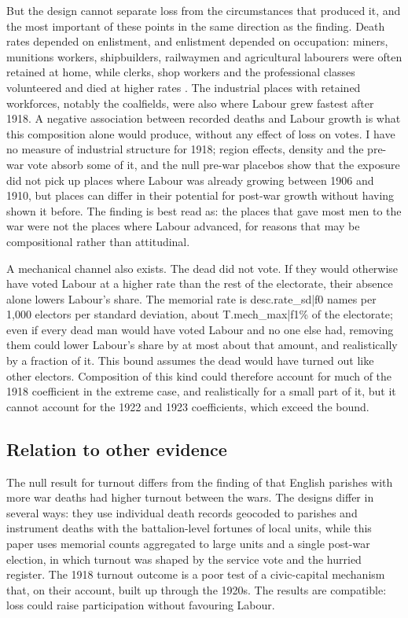 \documentclass[11pt,a4paper]{article}
\begin{document}
But the design cannot separate loss from the circumstances that produced it, and the most important of these points in the same direction as the finding. Death rates depended on enlistment, and enlistment depended on occupation: miners, munitions workers, shipbuilders, railwaymen and agricultural labourers were often retained at home, while clerks, shop workers and the professional classes volunteered and died at higher rates \citep{winter1977,dewey1984}. The industrial places with retained workforces, notably the coalfields, were also where Labour grew fastest after 1918. A negative association between recorded deaths and Labour growth is what this composition alone would produce, without any effect of loss on votes. I have no measure of industrial structure for 1918; region effects, density and the pre-war vote absorb some of it, and the null pre-war placebos show that the exposure did not pick up places where Labour was already growing between 1906 and 1910, but places can differ in their potential for post-war growth without having shown it before. The finding is best read as: the places that gave most men to the war were not the places where Labour advanced, for reasons that may be compositional rather than attitudinal.

A mechanical channel also exists. The dead did not vote. If they would otherwise have voted Labour at a higher rate than the rest of the electorate, their absence alone lowers Labour's share. The memorial rate is {{desc.rate_sd|f0}} names per 1,000 electors per standard deviation, about {{T.mech_max|f1}}\% of the electorate; even if every dead man would have voted Labour and no one else had, removing them could lower Labour's share by at most about that amount, and realistically by a fraction of it. This bound assumes the dead would have turned out like other electors. Composition of this kind could therefore account for much of the 1918 coefficient in the extreme case, and realistically for a small part of it, but it cannot account for the 1922 and 1923 coefficients, which exceed the bound.

\subsection{Relation to other evidence}
The null result for turnout differs from the finding of \citet{carozzi2023} that English parishes with more war deaths had higher turnout between the wars. The designs differ in several ways: they use individual death records geocoded to parishes and instrument deaths with the battalion-level fortunes of local units, while this paper uses memorial counts aggregated to large units and a single post-war election, in which turnout was shaped by the service vote and the hurried register. The 1918 turnout outcome is a poor test of a civic-capital mechanism that, on their account, built up through the 1920s. The results are compatible: loss could raise participation without favouring Labour.
\end{document}
